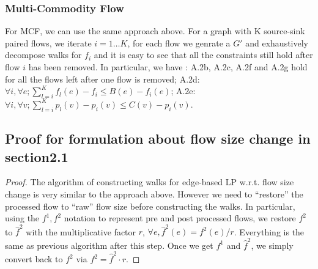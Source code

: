 \subsubsection{Multi-Commodity Flow}
For MCF, we can use the same approach above. For a graph with K source-sink paired flows,  we iterate $i = 1 \dots K$, for each flow we genrate a $G'$ and exhaustively decompose walks for $f_i$ and it is easy to see that all the constraints still hold after flow $i$ has been removed.  
In particular, we have :
A.2b, A.2c, A.2f and A.2g  hold for all the flows left after one flow is removed;
A.2d: $\forall i,\forall e;  \sum\limits_{l=i}^K f_l(e) - f_i\leq B(e) - f_i(e)$;
A.2e: $\forall i,\forall v;  \sum\limits_{l=i}^K p_l(v) -p_i(v)\leq C(v) - p_i(v)$.

\subsection{Proof for formulation about flow size change in section2.1} \label{subsec:lppaths}
\begin{proof}
The algorithm of constructing walks for edge-based LP w.r.t. flow size change is very similar to the approach above. However we need to ``restore'' the processed flow to ``raw'' flow size before constructing the walks. In particular, using the $f^1, f^2$ notation to represent pre and post processed flows, we restore $f^2$ to $\hat{f}^2$ with the multiplicative factor $r$, $ \forall e, \hat{f}^2(e)=f^2(e)/r$. Everything is the same as previous algorithm after this step. Once we get $f^1$ and $\hat{f}^2$, we simply convert back to $f^2$ via $f^2= \hat{f}^2 \cdot r$.
\end{proof}